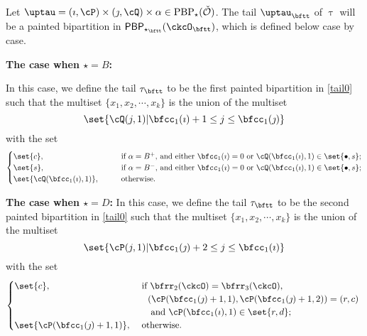 \documentclass[12pt,a4paper]{amsart}
\newcommand{\CO}{{\mathcal {O}}}
\numberwithin{equation}{section}
\theoremstyle{remark}
\def\PBP{\mathsf{PBP}}
\begin{document}
\medskip


Let $ \uptau=(\imath,\cP)\times(\jmath,\cQ)\times \alpha \in
\mathrm{PBP}_\star(\check \CO) $. The tail $\uptau_\bftt$ of $\uptau$ will be a painted bipartition in
$\PBP_{\star_\bftt}(\ckcO_\bftt)$, which is defined below case by case.

{\bfseries The case when $\star = B$:}

In this case, we define the tail $\tau_\bftt$ to be the first painted bipartition in \eqref{tail0} such that the multiset $\{x_1, x_2, \cdots, x_k\}$ is the
union of the multiset
\[
  \set{\cQ(j,1)| \bfcc_{1}(\imath)+1 \leq j \leq  \bfcc_{1}(\jmath) }
\]
with the set
\[
  \begin{cases}
 \set{c}, &
 \qquad
  \text{if $\alpha = B^+$, and either $\bfcc_{1}(\imath)=0$ or $\cQ(\bfcc_{1}(\imath),1)\in \set{\bullet,s}$};  \\
 \set{s},&
  \qquad \text{if $\alpha = B^-$, and either $\bfcc_{1}(\imath)=0$ or $\cQ(\bfcc_{1}(\imath),1)\in \set{\bullet,s}$}; \\
\set{\cQ(\bfcc_{1}(\imath),1)},&
\qquad
\text{otherwise.}
\end{cases}
\]

{\bfseries The case when $\star = D$:}
In this case, we define the tail $\tau_\bftt$ to be the second painted
bipartition in \eqref{tail0} such that the multiset $\{x_1, x_2, \cdots, x_k\}$
is the union of the multiset
\[
\set{\cP(j,1)| \bfcc_{1}(\jmath)+2 \leq j \leq \bfcc_{1}(\imath)}
\]
with the set
\[
\begin{cases}
    \set{c},                          &
    \ \text{if $\bfrr_2(\ckcO)=\bfrr_3(\ckcO)$,}                                                                         \\
                                      & \quad \text{$(\cP(\bfcc_{1}(\jmath)+1,1) ,\cP(\bfcc_{1}(\jmath)+1,2)) = (r,c)$ } \\
                                      & \quad \text{ and $\cP(\bfcc_1(\imath),1)\in \set{r,d}$};                                       \\
    \set{\cP(\bfcc_{1}(\jmath)+1,1)}, &
    \    \text{otherwise.}
  \end{cases}
\]
\end{document}
